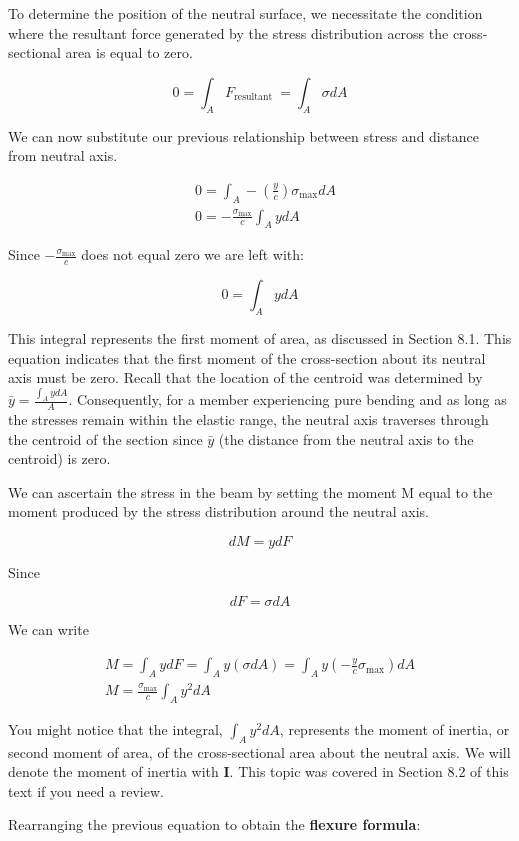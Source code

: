 \documentclass[
  letterpaper,
  DIV=11,
  numbers=noendperiod]{scrreprt}
\begin{document}
To determine the position of the neutral surface, we necessitate the
condition where the resultant force generated by the stress distribution
across the cross-sectional area is equal to zero.

\[
0=\int_A F_{\text {resultant }}=\int_A \sigma d A
\]

We can now substitute our previous relationship between stress and
distance from neutral axis.

\[
\begin{aligned}
& 0=\int_A-\left(\frac{y}{c}\right) \sigma_{\max } d A \\
& 0=-\frac{\sigma_{\max }}{c} \int_A y d A
\end{aligned}
\]

Since \(-\frac{\sigma_{\max }}{c}\) does not equal zero we are left
with:

\[
0=\int_A y d A
\]

This integral represents the first moment of area, as discussed in
Section 8.1. This equation indicates that the first moment of the
cross-section about its neutral axis must be zero. Recall that the
location of the centroid was determined by
\(\bar{y}=\frac{\int_A y d A}{A}\). Consequently, for a member
experiencing pure bending and as long as the stresses remain within the
elastic range, the neutral axis traverses through the centroid of the
section since \(\bar{y}\) (the distance from the neutral axis to the
centroid) is zero.

We can ascertain the stress in the beam by setting the moment M equal to
the moment produced by the stress distribution around the neutral axis.

\[
d M=y d F
\]

Since

\[
d F=\sigma d A
\]

We can write

\[
\begin{gathered}
M=\int_A y d F=\int_A y(\sigma d A)=\int_A y\left(-\frac{y}{c} \sigma_{\max }\right) d A \\
M=\frac{\sigma_{\max }}{c} \int_A y^2 d A
\end{gathered}
\]

You might notice that the integral, \(\int_A y^2 d A\), represents the
moment of inertia, or second moment of area, of the cross-sectional area
about the neutral axis. We will denote the moment of inertia with
\textbf{I}. This topic was covered in Section 8.2 of this text if you
need a review.

Rearranging the previous equation to obtain the \textbf{flexure
formula}:
\end{document}
